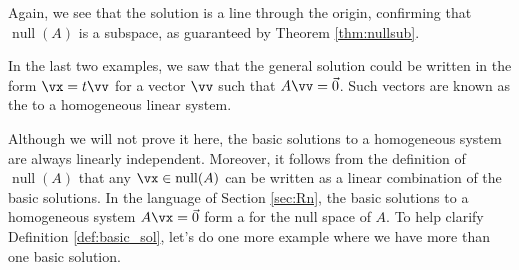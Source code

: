{
{
\begin{center}
\end{center}
}

Again, we see that the solution is a line through the origin, confirming that $\operatorname{null}(A)$ is a subspace, as guaranteed by Theorem \ref{thm:nullsub}.
}

\medskip

In the last two examples, we saw that the general solution could be written in the form $\vx = t\vv$ for a vector $\vv$ such that $A\vv =\vec 0$. Such vectors are known as the  to a  homogeneous linear system.

\smallskip


\smallskip

Although we will not prove it here, the basic solutions to a homogeneous system are always linearly independent. Moreover, it follows from the definition of $\operatorname{null}(A)$ that any $\vx \in\operatorname{null}(A)$ can be written as a linear combination of the basic solutions. In the language of Section \ref{sec:Rn}, the basic solutions to a homogeneous system $A\vx = \vec 0$ form a   for the null space of $A$. To help clarify Definition \ref{def:basic_sol}, let's do one more example where we have more than one basic solution.

\medskip

